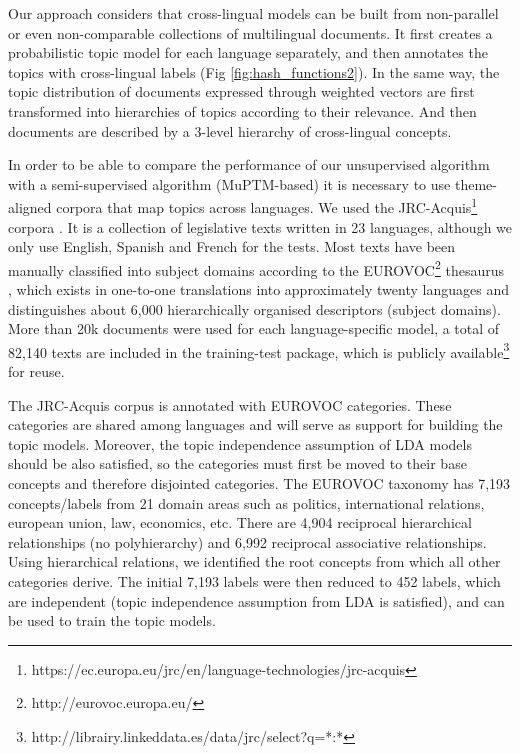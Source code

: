 Our approach considers that cross-lingual models can be built from non-parallel or even non-comparable collections of multilingual documents. It first creates a probabilistic topic model for each language separately, and then annotates the topics with cross-lingual labels (Fig \ref{fig:hash_functions2}). In the same way, the topic distribution of documents expressed through weighted vectors are first transformed into hierarchies of topics according to their relevance. And then documents are described by a 3-level hierarchy of cross-lingual concepts.

In order to be able to compare the performance of our unsupervised algorithm with a semi-supervised algorithm (MuPTM-based) it is necessary to use theme-aligned corpora that map topics across languages. We used the JRC-Acquis\footnote{https://ec.europa.eu/jrc/en/language-technologies/jrc-acquis} corpora \citep{Steinberger2006}. It is a collection of legislative texts written in 23 languages, although we only use English, Spanish and French for the tests. Most texts have been manually classified into subject domains according to the EUROVOC\footnote{http://eurovoc.europa.eu/} thesaurus \citep{Eurovoc1995}, which exists in one-to-one translations into approximately twenty languages and distinguishes about 6,000 hierarchically organised descriptors (subject domains). More than 20k documents were used for each language-specific model, a total of 82,140 texts are included in the training-test package, which is publicly available\footnote{http://librairy.linkeddata.es/data/jrc/select?q=*:*} for reuse.

The JRC-Acquis corpus is annotated with EUROVOC categories. These categories are shared among languages and will serve as support for building the topic models. Moreover, the topic independence assumption \citep{Blei2003} of LDA models should be also satisfied, so the categories must first be moved to their base concepts and therefore disjointed categories. The EUROVOC taxonomy has 7,193 concepts/labels from 21 domain areas such as politics, international relations, european union, law, economics, etc. There are 4,904 reciprocal hierarchical relationships (no polyhierarchy) and 6,992 reciprocal associative relationships. Using hierarchical relations, we identified the root concepts from which all other categories derive. The initial 7,193 labels were then reduced to 452 labels, which are independent (topic independence assumption from LDA is satisfied), and can be used to train the topic models. 


